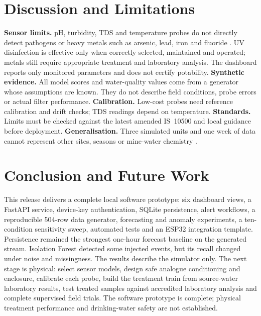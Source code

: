 \documentclass[10pt,letterpaper,twocolumn]{article}
\begin{document}
\section{Discussion and Limitations}
\textbf{Sensor limits.} pH, turbidity, TDS and temperature probes do not directly detect pathogens or heavy metals such as arsenic, lead, iron and fluoride \cite{singh2015}. UV disinfection is effective only when correctly selected, maintained and operated; metals still require appropriate treatment and laboratory analysis. The dashboard reports only monitored parameters and does not certify potability. \textbf{Synthetic evidence.} All model scores and water-quality values come from a generator whose assumptions are known. They do not describe field conditions, probe errors or actual filter performance. \textbf{Calibration.} Low-cost probes need reference calibration and drift checks; TDS readings depend on temperature. \textbf{Standards.} Limits must be checked against the latest amended IS~10500 and local guidance before deployment. \textbf{Generalisation.} Three simulated units and one week of data cannot represent other sites, seasons or mine-water chemistry \cite{panigrahy2015}.

\section{Conclusion and Future Work}
This release delivers a complete local software prototype: six dashboard views, a FastAPI service, device-key authentication, SQLite persistence, alert workflows, a reproducible 504-row data generator, forecasting and anomaly experiments, a ten-condition sensitivity sweep, automated tests and an ESP32 integration template. Persistence remained the strongest one-hour forecast baseline on the generated stream. Isolation Forest detected some injected events, but its recall changed under noise and missingness. The results describe the simulator only. The next stage is physical: select sensor models, design safe analogue conditioning and enclosure, calibrate each probe, build the treatment train from source-water laboratory results, test treated samples against accredited laboratory analysis and complete supervised field trials. The software prototype is complete; physical treatment performance and drinking-water safety are not established.

\end{document}
